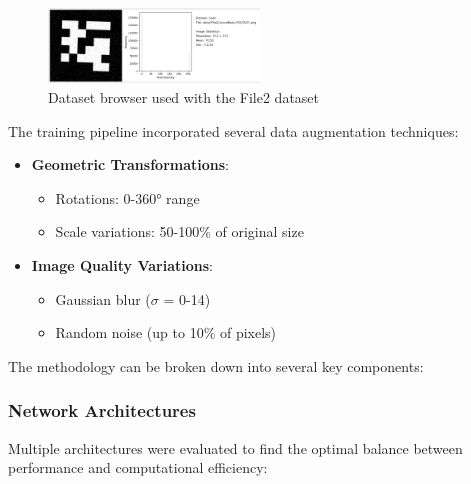 \documentclass[conference]{IEEEtran}
\begin{document}
\begin{figure}[h]
  \centering
  \includegraphics[width=0.5\textwidth]{images/aruco-dataset-browser-1.png}
  \caption{Dataset browser used with the File2 dataset}
  \label{fig:data_browser_1}
\end{figure}

The training pipeline incorporated several data augmentation techniques:

\begin{itemize}
    \item \textbf{Geometric Transformations}:
    \begin{itemize}
        \item Rotations: 0-360° range
        \item Scale variations: 50-100\% of original size
    \end{itemize}
    
    \item \textbf{Image Quality Variations}:
    \begin{itemize}
        \item Gaussian blur ($\sigma$ = 0-14)
        \item Random noise (up to 10\% of pixels)
    \end{itemize}
\end{itemize}


The methodology can be broken down into several key components:

\subsubsection{Network Architectures}

Multiple architectures were evaluated to find the optimal balance between performance and computational efficiency:
\end{document}
